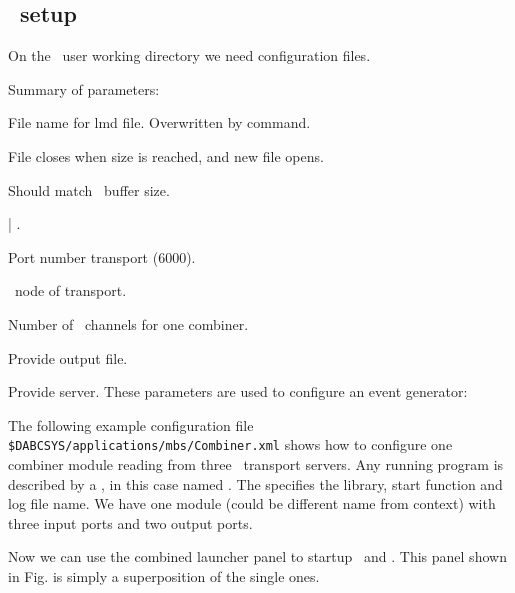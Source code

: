 {\subsection{\dabc\ setup}
On the \dabc\ user working directory we need configuration files.

Summary of parameters:
\bdes
\item[MbsFileName] File name for lmd file. Overwritten by command.
\item[MbsFileSizeLimit] File closes when size is reached, and new file opens.
\item[BufferSize] Should match \mbs\ buffer size.
\item[MbsServerKind]  | .
\item[MbsServerPort] Port number transport (6000).
\item[MbsServerName] \mbs\ node of transport.
\item[NumInputs] Number of \mbs\ channels for one combiner.
\item[DoFile] Provide output file.
\item[DoServer] Provide server.
\edes
These parameters are used to configure an event generator:
\bdes
\item[NumSubevents]
\item[FirstProcId]
\item[SubeventSize]
\item[Go4Random]
\edes
The following example configuration file {\tt \$DABCSYS/applications/mbs/Combiner.xml} shows how to 
configure one combiner module reading from three \mbs\ transport servers.
Any running program is described by a , in this case
named . The  specifies the
library, start function and log file name.
We have one module  (could be different name from context) 
with three input ports and two output ports.

Now we can use the combined launcher panel to startup \mbs\ and \dabc.
This panel shown in Fig. \pageref{fig:user-gui-pan-dabcmbs} is simply a superposition of the single ones.
}
